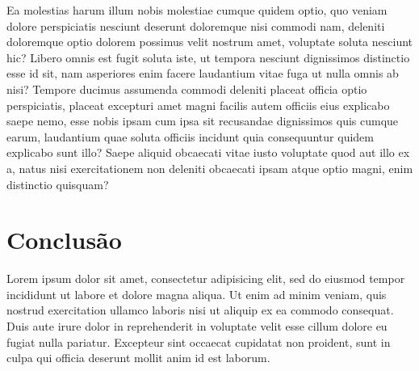 \documentclass[
    12pt,               %
    openright,          %
    twoside,            %
    a4paper,            %
    chapter=TITLE,     %
    english,            %
    spanish,            %
    portuguese              %
    ]{abntex2}
\begin{document}
Ea molestias harum illum nobis molestiae cumque quidem optio, quo veniam dolore perspiciatis nesciunt deserunt doloremque nisi commodi nam, deleniti doloremque optio dolorem possimus velit nostrum amet, voluptate soluta nesciunt hic? Libero omnis est fugit soluta iste, ut tempora nesciunt dignissimos distinctio esse id sit, nam asperiores enim facere laudantium vitae fuga ut nulla omnis ab nisi? Tempore ducimus assumenda commodi deleniti placeat officia optio perspiciatis, placeat excepturi amet magni facilis autem officiis eius explicabo saepe nemo, esse nobis ipsam cum ipsa sit recusandae dignissimos quis cumque earum, laudantium quae soluta officiis incidunt quia consequuntur quidem explicabo sunt illo? Saepe aliquid obcaecati vitae iusto voluptate quod aut illo ex a, natus nisi exercitationem non deleniti obcaecati ipsam atque optio magni, enim distinctio quisquam?


\chapter{Conclusão}

Lorem ipsum dolor sit amet, consectetur adipisicing elit, sed do eiusmod tempor incididunt ut labore et dolore magna aliqua. Ut enim ad minim veniam, quis nostrud exercitation ullamco laboris nisi ut aliquip ex ea commodo consequat. Duis aute irure dolor in reprehenderit in voluptate velit esse cillum dolore eu fugiat nulla pariatur. Excepteur sint occaecat cupidatat non proident, sunt in culpa qui officia deserunt mollit anim id est laborum.



\postextual





%
%








\printindex
\end{document}
